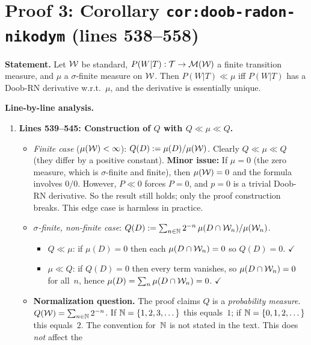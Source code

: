 \documentclass{article}
\begin{document}
\section{Proof 3: Corollary \texttt{cor:doob-radon-nikodym} (lines 538--558)}

\textbf{Statement.} Let $\mathcal{W}$ be standard, $P(W|T):\mathcal{T}\to\mathcal{M}(\mathcal{W})$ a finite
transition measure, and $\mu$ a $\sigma$-finite measure on $\mathcal{W}$.  Then
$P(W|T) \ll \mu$ iff $P(W|T)$ has a Doob-RN derivative w.r.t.\ $\mu$, and the
derivative is essentially unique.

\textbf{Line-by-line analysis.}

\begin{enumerate}[leftmargin=*]
  \item \textbf{Lines 539--545: Construction of $Q$ with $Q \ll \mu \ll Q$.}
    \begin{itemize}
      \item \emph{Finite case} ($\mu(\mathcal{W})<\infty$): $Q(D):=\mu(D)/\mu(\mathcal{W})$.
            Clearly $Q \ll \mu \ll Q$ (they differ by a positive constant).
            \textbf{Minor issue:} If $\mu = 0$ (the zero measure, which is
            $\sigma$-finite and finite), then $\mu(\mathcal{W})=0$ and the formula
            involves $0/0$.  However, $P \ll 0$ forces $P=0$, and $p=0$ is a
            trivial Doob-RN derivative.  So the result still holds; only the
            proof construction breaks.  This edge case is harmless in practice.
      \item \emph{$\sigma$-finite, non-finite case}:
            $Q(D) := \sum_{n\in\mathbb{N}} 2^{-n}\,\mu(D\cap\mathcal{W}_n)/\mu(\mathcal{W}_n)$.
            \begin{itemize}
              \item $Q \ll \mu$: if $\mu(D)=0$ then each $\mu(D\cap\mathcal{W}_n)=0$
                    so $Q(D)=0$.  $\checkmark$
              \item $\mu \ll Q$: if $Q(D)=0$ then every term vanishes, so
                    $\mu(D\cap\mathcal{W}_n)=0$ for all~$n$, hence
                    $\mu(D)=\sum_n \mu(D\cap\mathcal{W}_n)=0$.  $\checkmark$
            \end{itemize}
      \item \textbf{Normalization question.}
            The proof claims $Q$ is a \emph{probability measure}.
            $Q(\mathcal{W})=\sum_{n\in\mathbb{N}} 2^{-n}$.  If $\mathbb{N}=\{1,2,3,\dots\}$ this
            equals~$1$; if $\mathbb{N}=\{0,1,2,\dots\}$ this equals~$2$.  The convention
            for~$\mathbb{N}$ is not stated in the text.  This does \emph{not} affect the

\end{itemize}
\end{enumerate}
\end{document}
